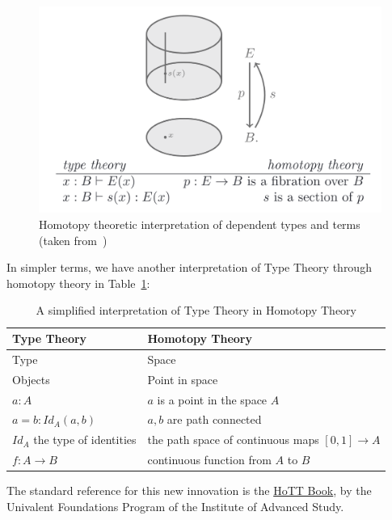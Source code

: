 \documentclass[acmsmall]{acmart}
\begin{document}
\begin{figure}[H]
  \centering
  \includegraphics[scale=0.3]{fibration}
  \caption{Homotopy theoretic interpretation of dependent types
and terms (taken from~\cite{pelayo2014homotopy})}
\end{figure}

In simpler terms, we have another interpretation of Type Theory through homotopy
theory in Table~\ref{tab:hott}:

\begin{table}[H]
  \caption{A simplified interpretation of Type Theory in Homotopy
    Theory\cite{awodey2013voevodskys}}
  \label{tab:hott}
\begin{tabular}{ll}
  \toprule
  Type Theory & Homotopy Theory\\
  \midrule
  Type & Space \\
  Objects & Point in space\\
  $a:A$ & $a$ is a point in the space $A$\\
  $a=b:Id_{A}(a, b)$ & $a,b$ are path connected\\
  $Id_{A}$ the type of identities & the path space of continuous maps $[0,1]\to A$\\
  $f:A\to B$ & continuous function from $A$ to $B$\\
  \bottomrule
\end{tabular}
\end{table}

The standard reference for this new innovation is the
\href{https://homotopytypetheory.org/book/}{HoTT Book}\cite{hottbook}, by the
Univalent Foundations Program of the Institute of Advanced Study.
\end{document}
